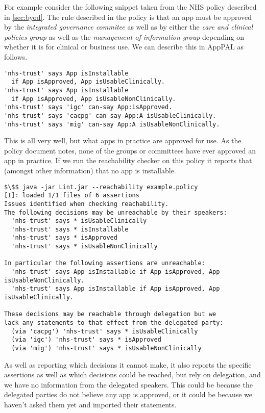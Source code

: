 \documentclass[a4paper]{scrartcl}
\begin{document}
For example consider the following snippet taken from the NHS policy described
in \autoref{sec:byod}.  The rule described in the policy is that an app must be
approved by the \emph{integrated governance commitee} as well as by either the
\emph{care and clinical policies group} as well as the \emph{management of
  information group} depending on whether it is for clinical or business use. We
can describe this in AppPAL as follows.
\begin{lstlisting}
'nhs-trust' says App isInstallable
  if App isApproved, App isUsableClinically.
'nhs-trust' says App isInstallable
  if App isApproved, App isUsableNonClinically.
'nhs-trust' says 'igc' can-say App:isApproved.
'nhs-trust' says 'cacpg' can-say App:A isUsableClinically.
'nhs-trust' says 'mig' can-say App:A isUsableNonClinically.
\end{lstlisting}

This is all very well, but what apps in practice are approved for use.
As the policy document notes, none of the groups or committees have ever
approved an app in practice.  If we run the reachability checker on this policy
it reports that (amongst other information) that no app is installable.

\begin{lstlisting}
$\$$ java -jar Lint.jar --reachability example.policy
[I]: loaded 1/1 files of 6 assertions
Issues identified when checking reachability.
The following decisions may be unreachable by their speakers:
  'nhs-trust' says * isUsableClinically
  'nhs-trust' says * isInstallable
  'nhs-trust' says * isApproved
  'nhs-trust' says * isUsableNonClinically

In particular the following assertions are unreachable:
  'nhs-trust' says App isInstallable if App isApproved, App isUsableNonClinically.
  'nhs-trust' says App isInstallable if App isApproved, App isUsableClinically.

These decisions may be reachable through delegation but we
lack any statements to that effect from the delegated party:
  (via 'cacpg') 'nhs-trust' says * isUsableClinically
  (via 'igc') 'nhs-trust' says * isApproved
  (via 'mig') 'nhs-trust' says * isUsableNonClinically
\end{lstlisting}

As well as reporting which decisions it cannot make, it also reports the
specific assertions as well as which decisions could be reached, but rely on
delegation, and we have no information from the delegated speakers.  This could
be because the delegated parties do not believe any app is approved, or it could
be because we haven't asked them yet and imported their statements.
\end{document}
